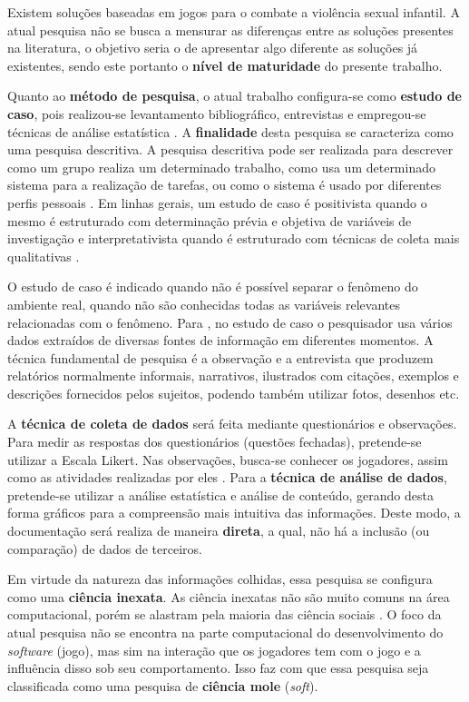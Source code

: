 \documentclass[12pt]{article}
\begin{document}
\newpage

Existem soluções baseadas em jogos para o combate a violência sexual infantil. A atual pesquisa não se busca a mensurar as diferenças entre as soluções presentes na literatura, o objetivo seria o de apresentar algo diferente as soluções já existentes, sendo este portanto o \textbf{nível de maturidade} do presente trabalho. 

Quanto ao \textbf{método de pesquisa}, o atual trabalho configura-se como \textbf{estudo de caso}, pois realizou-se levantamento bibliográfico, entrevistas e empregou-se técnicas de análise estatística \cite{freitas2000metodo}. A \textbf{finalidade} desta pesquisa se caracteriza como uma pesquisa descritiva. A pesquisa descritiva pode ser realizada para descrever como um grupo realiza um determinado trabalho, como usa um determinado sistema para a realização de tarefas, ou como o sistema é usado por diferentes perfis pessoais \cite{fontelles2009metodologia}. Em linhas gerais, um estudo de caso é positivista quando o mesmo é estruturado com determinação prévia e objetiva de variáveis de investigação e interpretativista quando é estruturado com técnicas de coleta mais qualitativas \cite{saccol2009retorno}.

O estudo de caso é indicado quando não é possível separar o fenômeno do ambiente real, quando não são conhecidas todas as variáveis relevantes relacionadas com o fenômeno. Para , no estudo de caso o pesquisador usa vários dados extraídos de diversas fontes de informação em diferentes momentos. A técnica fundamental de pesquisa é a observação e a entrevista que produzem relatórios normalmente informais, narrativos, ilustrados com citações, exemplos e descrições fornecidos pelos sujeitos, podendo também utilizar fotos, desenhos etc.

A \textbf{técnica de coleta de dados} será feita mediante questionários e observações. Para medir as respostas dos questionários (questões fechadas), pretende-se utilizar a Escala Likert. Nas observações, busca-se conhecer os jogadores, assim como as atividades realizadas por eles \cite{dias2000grupo}. Para a \textbf{técnica de análise de dados}, pretende-se utilizar a análise estatística e análise de conteúdo, gerando desta forma gráficos para a compreensão mais intuitiva das informações. Deste modo, a documentação será realiza de maneira \textbf{direta}, a qual, não há a inclusão (ou comparação) de dados de terceiros. 

Em virtude da natureza das informações colhidas, essa pesquisa se configura como uma \textbf{ciência inexata}. As ciência inexatas não são muito comuns na área computacional, porém se alastram pela maioria das ciência sociais \cite{wazlawick2010reflexao}. O foco da atual pesquisa não se encontra na parte computacional do desenvolvimento do \textit{software} (jogo), mas sim na interação que os jogadores tem com o jogo e a influência disso sob seu comportamento. Isso faz com que essa pesquisa seja classificada como uma pesquisa de \textbf{ciência mole} (\textit{soft}).
\end{document}
